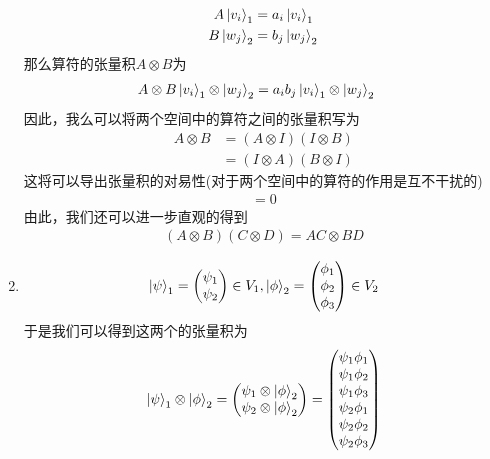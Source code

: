 \documentclass{article}
\begin{document}
\begin{enumerate}
    \begin{align*}
        A\ket{v_i}_1&=a_i\ket{v_i}_1\\
        B\ket{w_j}_2&=b_j\ket{w_j}_2
    \end{align*}
    那么算符的张量积$A\otimes B$为
    \begin{align*}
        A\otimes B \ket{v_i}_1\otimes \ket{w_j}_2&=a_ib_j\ket{v_i}_1\otimes \ket{w_j}_2
    \end{align*}
    因此，我么可以将两个空间中的算符之间的张量积写为
    \begin{align*}
        A\otimes B&=(A\otimes I)(I\otimes B)\\
        &=(I\otimes A)(B\otimes I)
    \end{align*}
    这将可以导出张量积的对易性(对于两个空间中的算符的作用是互不干扰的)
    \begin{align*}
        [A\otimes I,I\otimes B]=0
    \end{align*}
    由此，我们还可以进一步直观的得到
    \begin{align*}
        (A\otimes B)(C\otimes D)=AC\otimes BD
    \end{align*}
    \item 
    \begin{align*}
        \ket{\psi}_1=
        \begin{pmatrix}
            \psi_1\\ \psi_2
        \end{pmatrix}\in V_1
        ,\ket{\phi}_2=
        \begin{pmatrix}
            \phi_1\\ \phi_2\\ \phi_3 
        \end{pmatrix}\in V_2
    \end{align*}
    于是我们可以得到这两个的张量积为
    \begin{align*}
        \ket{\psi}_1\otimes\ket{\phi}_2
        =
        \begin{pmatrix}
            \psi_1\otimes\ket{\phi}_2\\ \psi_2\otimes\ket{\phi}_2
        \end{pmatrix}
        =
        \begin{pmatrix}
            \psi_1\phi_1\\\psi_1\phi_2\\\psi_1\phi_3\\\psi_2\phi_1\\\psi_2\phi_2\\\psi_2\phi_3
        \end{pmatrix}

\end{align*}
\end{enumerate}
\end{document}
